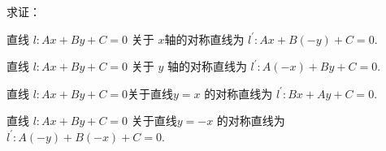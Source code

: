 \begin{homework}求证：

直线 $ l: A x+B y+C=0 $ 关于 $ x  $轴的对称直线为  $l^{\prime}: A x+B(-y)+   C=0 .$

直线 $ l: A x+B y+C=0 $ 关于 $ y$  轴的对称直线为 $ l^{\prime}: A(-x)+B y+   C=0 .$

直线 $ l: A x+B y+C=0  $关于直线$  y=x $ 的对称直线为  $l^{\prime}: B x+   A y+C=0 .$

直线 $ l: A x+B y+C=0 $ 关于直线$  y=-x $ 的对称直线为 $ l^{\prime}: A(-y)+   B(-x)+C=0 .$
\end{homework}
\begin{homework}
    
\end{homework}
\begin{homework}
    
\end{homework}
\begin{homework}
    
\end{homework}
\begin{homework}
    
\end{homework}
\begin{homework}
    
\end{homework}
\begin{homework}
    
\end{homework}
\begin{homework}
    
\end{homework}
\begin{homework}
    
\end{homework}
\begin{homework}
    
\end{homework}

\clearpage
